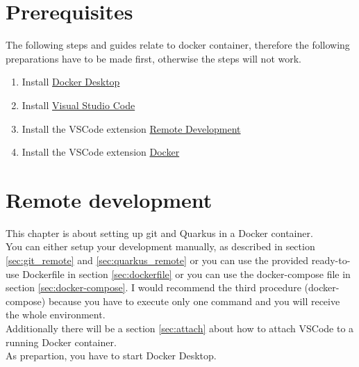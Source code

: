 \chapter{Prerequisites}
    The following steps and guides relate to docker container, therefore the following preparations have to be made first, otherwise the steps will not work.  

    \begin{enumerate}
        \item Install \href{https://www.docker.com/products/docker-desktop/}{Docker Desktop}
        \item Install \href{https://code.visualstudio.com/download}{Visual Studio Code} 
        \item Install the VSCode extension \href{https://marketplace.visualstudio.com/items?itemName=ms-vscode-remote.vscode-remote-extensionpack}{Remote Development} 
        \item Install the VSCode extension \href{https://marketplace.visualstudio.com/items?itemName=ms-azuretools.vscode-docker}{Docker}
    \end{enumerate}    

\chapter{Remote development}
    This chapter is about setting up git and Quarkus in a Docker container. \\
    You can either setup your development manually, as described in section \ref{sec:git_remote} and \ref{sec:quarkus_remote} or you can use the provided ready-to-use Dockerfile in section \ref{sec:dockerfile} or you can use the docker-compose file in section \ref{sec:docker-compose}. I would recommend the third procedure (docker-compose) because you have to execute only one command and you will receive the whole environment. \\
    Additionally there will be a section \ref{sec:attach} about how to attach VSCode to a running Docker container. \\
    As prepartion, you have to start Docker Desktop. 


